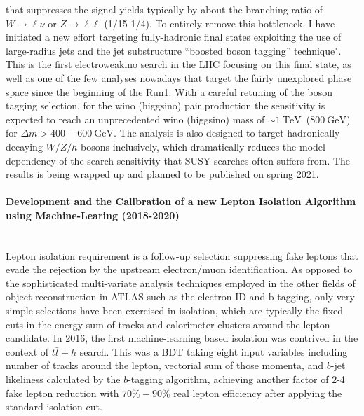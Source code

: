 \documentclass[12pt]{article}
\newcommand{\Subsubsection}[1]{\subsubsection*{#1}
\addcontentsline{toc}{subsubsection}{#1}}
\newcommand{\dm}{\ensuremath{\Delta m}\xspace}
\newcommand{\ra}{\rightarrow}
\newcommand{\GeV}{\text{GeV}\xspace}
\newcommand{\TeV}{\text{TeV}\xspace}
\begin{document}
that suppresses the signal yields typically by about the branching ratio of $W \ra \ell\nu$ or $Z \ra \ell\ell$ (1/15-1/4).
To entirely remove this bottleneck, I have initiated a new effort targeting fully-hadronic final states exploiting the use of large-radius jets and the jet substructure ``boosted boson tagging'' technique". %
This is the first electroweakino search in the LHC focusing on this final state, as well as one of the few analyses nowadays that target the fairly unexplored phase space since the beginning of the Run1.
With a careful retuning of the boson tagging selection, for the wino (higgsino) pair production the sensitivity is expected to reach an unprecedented wino (higgsino) mass of $\sim 1~\TeV$~($800~\GeV$) for $\dm>400-600~\GeV$.
The analysis is also designed to target hadronically decaying $W/Z/h$ bosons inclusively, which dramatically reduces the model dependency of the search sensitivity that SUSY searches often suffers from.
The results is being wrapped up and planned to be published on spring 2021.

\paragraph{Development and the Calibration of a new Lepton Isolation Algorithm using Machine-Learing (2018-2020)}  \phantom{k} \vspace{3mm} \\
Lepton isolation requirement is a follow-up selection suppressing fake leptons that evade the rejection by the upstream electron/muon identification.
As opposed to the sophisticated multi-variate analysis techniques employed in the other fields of object reconstruction in ATLAS such as the electron ID and b-tagging,
only very simple selections have been exercised in isolation, which are typically the fixed cuts in the energy sum of tracks and calorimeter clusters around the lepton candidate.
In 2016, the first machine-learning based isolation was contrived in the context of $t\bar{t}+h$ search. 
This was a BDT taking eight input variables including number of tracks around the lepton, vectorial sum of those momenta, and $b$-jet likeliness calculated by the $b$-tagging algorithm, 
achieving another factor of 2-4 fake lepton reduction with $70\%-90\%$ real lepton efficiency after applying the standard isolation cut. 
\end{document}
